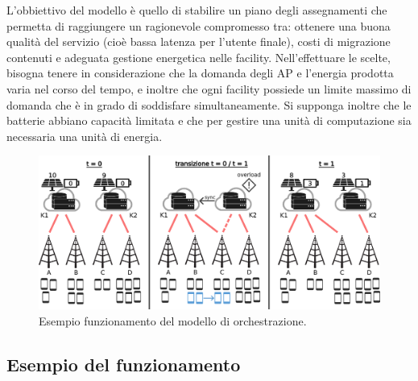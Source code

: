 L'obbiettivo del modello è quello di stabilire un piano degli assegnamenti che permetta di raggiungere un ragionevole compromesso tra: ottenere una buona qualità del servizio (cioè bassa latenza per l'utente finale), costi di migrazione contenuti e adeguata gestione energetica nelle facility. Nell'effettuare le scelte, bisogna tenere in considerazione che la domanda degli AP e l'energia prodotta varia nel corso del tempo, e inoltre che ogni facility possiede un limite massimo di domanda che è in grado di soddisfare simultaneamente. Si supponga inoltre che le batterie abbiano capacità limitata e che per gestire una unità di computazione sia necessaria una unità di energia.

\begin{figure}[t]
    \centering
    \includegraphics[width = 150mm]{img/esempio-assegnamenti.png}
    \caption{Esempio funzionamento del modello di orchestrazione.}
    \label{fig:esempio-assegnamenti}
\end{figure}


%
%
\subsection{Esempio del funzionamento}
\label{sub-sec:esempio-funzionamento}

